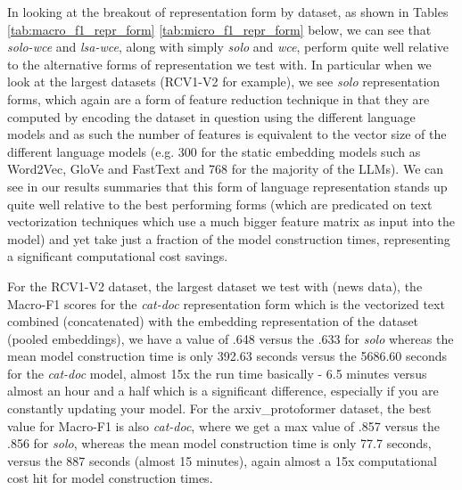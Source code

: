 \documentclass[final]{clv2025}
\begin{document}
In looking at the breakout of representation form by dataset, as shown in Tables \ref{tab:macro_f1_repr_form} \ref{tab:micro_f1_repr_form} below, we can see that \textit{solo-wce} and \textit{lsa-wce}, along with simply \textit{solo} and \textit{wce}, perform quite well relative to the alternative forms of representation we test with. In particular when we look at the largest datasets (RCV1-V2 for example), we see \textit{solo} representation forms, which again are a form of feature reduction technique in that they are computed by encoding the dataset in question using the different language models and as such the number of features is equivalent to the vector size of the different language models (e.g. 300 for the static embedding models such as Word2Vec, GloVe and FastText and 768 for the majority of the LLMs). We can see in our results summaries that this form of language representation stands up quite well relative to the best performing forms (which are predicated on text vectorization techniques which use a much bigger feature matrix as input into the model) and yet take just a fraction of the model construction times, representing a significant computational cost savings.

For the RCV1-V2 dataset, the largest dataset we test with (news data), the Macro-F1 scores for the \textit{cat-doc} representation form which is the vectorized text combined (concatenated) with the embedding representation of the dataset (pooled embeddings), we have a value of .648 versus the .633 for \textit{solo} whereas the mean model construction time is only 392.63 seconds versus the 5686.60 seconds for the \textit{cat-doc} model, almost 15x the run time basically - 6.5 minutes versus almost an hour and a half which is a significant difference, especially if you are constantly updating your model. For the arxiv\_protoformer dataset, the best value for Macro-F1 is also \textit{cat-doc}, where we get a max value of .857 versus the .856 for \textit{solo}, whereas the mean model construction time is only 77.7 seconds, versus the 887 seconds (almost 15 minutes), again almost a 15x computational cost hit for model construction times.
\end{document}
